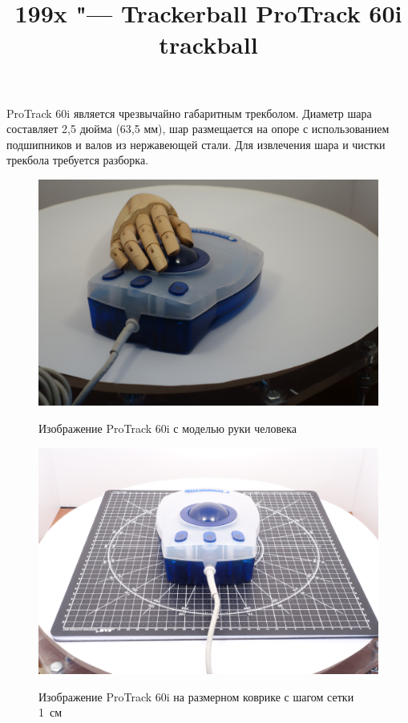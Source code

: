 \documentclass[11pt, a4paper]{article}
\begin{document}
\title{199x "--- Trackerball ProTrack 60i trackball}
\date{}
\maketitle

    ProTrack 60i является чрезвычайно габаритным трекболом. Диаметр шара составляет 2,5 дюйма (63,5 мм), шар размещается на опоре с использованием подшипников и валов из нержавеющей стали. Для извлечения шара и чистки трекбола требуется разборка.
    
    \begin{figure}[h]
        \centering
    \includegraphics[scale=0.3]{19xx_protrack_60i/raz_monstr.JPG}
        \label{m4-hand}
        \caption{Изображение ProTrack 60i с моделью руки человека}
    \end{figure}
    \begin{figure}[h]
        \centering
    \includegraphics[scale=0.3]{19xx_protrack_60i/monstr2.jpg}
        \label{m4-size}
        \caption{Изображение ProTrack 60i на размерном коврике с шагом сетки 1~см}
    \end{figure}
\end{document}

